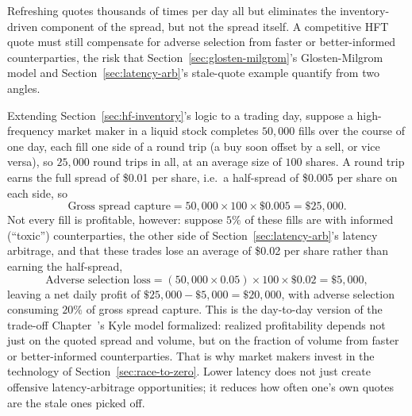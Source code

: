 \documentclass[../ai_in_finance]{subfiles}
\begin{document}
Refreshing quotes thousands of times per day all but eliminates the inventory-driven component of the spread,
but not the spread itself. A competitive HFT quote must still compensate for adverse selection from
faster or better-informed counterparties, the risk that Section~\ref{sec:glosten-milgrom}'s Glosten-Milgrom model and Section~\ref{sec:latency-arb}'s
stale-quote example quantify from two angles.

\label{sec:hf-pnl}

Extending Section~\ref{sec:hf-inventory}'s logic to a trading day, suppose a high-frequency market maker in a liquid stock completes $50{,}000$ fills over the course of one day, each fill one side of a round trip (a buy soon offset by a sell, or vice versa), so $25{,}000$ round trips in all, at an average size of $100$ shares. A round trip earns the full spread of \$0.01 per share, i.e.\ a half-spread of \$0.005 per share on each side, so
\begin{equation*}
\text{Gross spread capture} = 50{,}000 \times 100 \times \$0.005 = \$25{,}000.
\end{equation*}
Not every fill is profitable, however: suppose $5\%$ of these fills are with informed (``toxic'') counterparties, the other side of Section~\ref{sec:latency-arb}'s latency arbitrage, and that these trades lose an average of \$0.02 per share rather than earning the half-spread,
\begin{equation*}
\text{Adverse selection loss} = (50{,}000 \times 0.05) \times 100 \times \$0.02 = \$5{,}000,
\end{equation*}
leaving a net daily profit of $\$25{,}000 - \$5{,}000 = \$20{,}000$, with adverse selection consuming $20\%$ of gross spread capture. This is the day-to-day version of the trade-off Chapter~'s Kyle model formalized: realized profitability depends not just on the quoted spread and volume, but on the fraction of volume from faster or better-informed counterparties. That is why market makers invest in the technology of Section~\ref{sec:race-to-zero}. Lower latency does not just create offensive latency-arbitrage opportunities; it reduces how often one's own quotes are the stale ones picked off.
\end{document}
